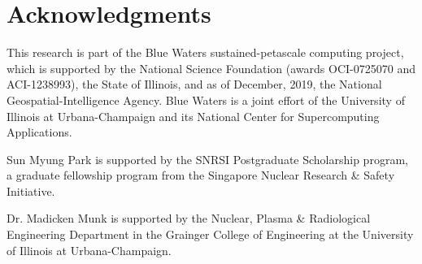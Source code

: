 \section{Acknowledgments}

This research is part of the Blue Waters sustained-petascale computing project,
which is supported by the National Science Foundation (awards OCI-0725070 and
ACI-1238993), the State of Illinois, and as of December, 2019, the National
Geospatial-Intelligence Agency. Blue Waters is a joint effort of the University
of Illinois at Urbana-Champaign and its National Center for Supercomputing
Applications.

Sun Myung Park is supported by the SNRSI Postgraduate Scholarship program, a
graduate fellowship program from the Singapore Nuclear Research \& Safety
Initiative.

Dr. Madicken Munk is supported by the Nuclear, Plasma \& Radiological
Engineering Department in the Grainger College of Engineering at the University
of Illinois at Urbana-Champaign.

